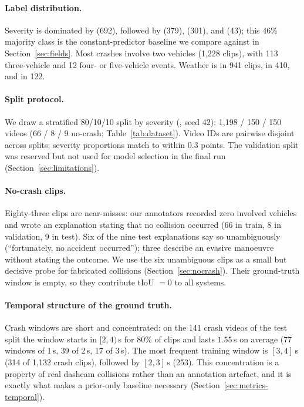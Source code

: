 \paragraph{Label distribution.}
Severity is dominated by  (692), followed by  (379),  (301), and  (43); this $46\%$ majority class is the constant-predictor baseline we compare against in Section~\ref{sec:fields}.
Most crashes involve two vehicles (1{,}228 clips), with 113 three-vehicle and 12 four- or five-vehicle events.
Weather is  in 941 clips,  in 410, and  in 122.



\paragraph{Split protocol.}
We draw a stratified 80/10/10 split by severity (, seed 42): 1{,}198 / 150 / 150 videos (66 / 8 / 9 no-crash; Table~\ref{tab:dataset}).
Video IDs are pairwise disjoint across splits; severity proportions match to within $0.3$ points.
The validation split was reserved but not used for model selection in the final run (Section~\ref{sec:limitations}).

\paragraph{No-crash clips.}
Eighty-three clips are near-misses: our annotators recorded zero involved vehicles and wrote an explanation stating that no collision occurred (66 in train, 8 in validation, 9 in test).
Six of the nine test explanations say so unambiguously (``fortunately, no accident occurred''); three describe an evasive manoeuvre without stating the outcome.
We use the six unambiguous clips as a small but decisive probe for fabricated collisions (Section~\ref{sec:nocrash}).
Their ground-truth window is empty, so they contribute tIoU $=0$ to all systems.

\paragraph{Temporal structure of the ground truth.}
Crash windows are short and concentrated: on the 141 crash videos of the test split the window starts in $[2,4)$\,s for 80\% of clips and lasts $1.55$\,s on average (77 windows of 1\,s, 39 of 2\,s, 17 of 3\,s).
The most frequent training window is $[3,4]$\,s (314 of 1{,}132 crash clips), followed by $[2,3]$\,s (253).
This concentration is a property of real dashcam collisions rather than an annotation artefact, and it is exactly what makes a prior-only baseline necessary (Section~\ref{sec:metrics-temporal}).

